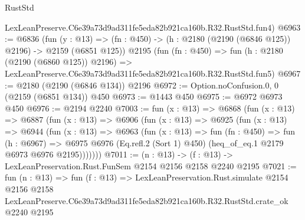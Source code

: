 \begin{lexlean}{RustStd}
\begin{coremodule}
    LexLeanPreserve.C6e39a73d9ad311fe5eda82b921ca160b.R32.RustStd.fun4)
@6963 := @6836
    (fun (y : @13) => (fn : @450) -> (h : @2180 (@2190 (@6846 @125)) @2196) -> @2159 (@6851 @125))
    @2195
    (fun (fn : @450) =>
    fun (h : @2180 (@2190 (@6860 @125)) @2196) =>
    LexLeanPreserve.C6e39a73d9ad311fe5eda82b921ca160b.R32.RustStd.fun5)
@6967 := @2180 (@2190 (@6846 @134)) @2196
@6972 := Option.noConfusion.{0, 0} (@2159 (@6851 @134)) @450
@6973 := @1443 @450
@6975 := @6972 @6973 @450
@6976 := @2194 @2240
@7003 := fun (x : @13) =>
  @6868
    (fun (x : @13) =>
    @6887
      (fun (x : @13) =>
      @6906
        (fun (x : @13) =>
        @6925
          (fun (x : @13) =>
          @6944
            (fun (x : @13) =>
            @6963
              (fun (x : @13) =>
              fun (fn : @450) =>
              fun (h : @6967) =>
              @6975 @6976 (Eq.refl.{2} (Sort 1) @450) (heq_of_eq.{1} @2179 @6973 @6976 @2195)))))))
@7011 := (n : @13) -> (f : @13) -> LexLeanPreservation.Rust.FunSem @2154 @2156 @2158 @2240 @2195
@7021 := fun (n : @13) =>
  fun (f : @13) =>
  LexLeanPreservation.Rust.simulate
    @2154
    @2156
    @2158
    LexLeanPreserve.C6e39a73d9ad311fe5eda82b921ca160b.R32.RustStd.crate_ok
    @2240
    @2195
\end{coremodule}
\end{lexlean}
